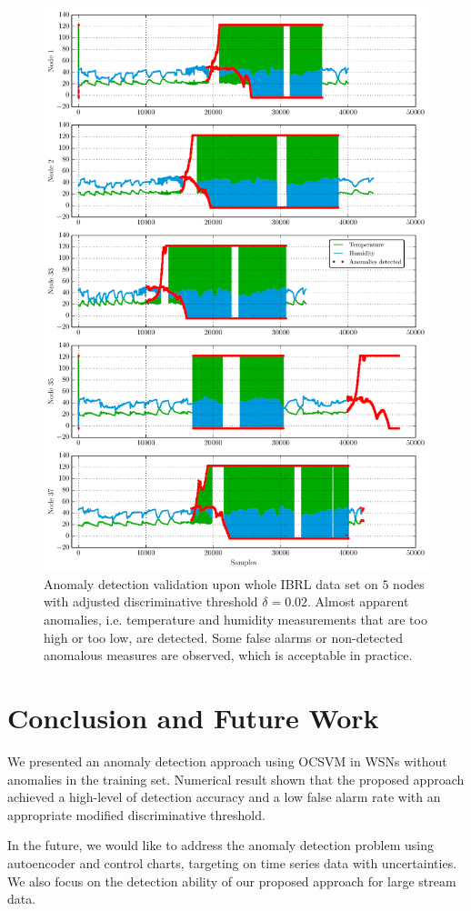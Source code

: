 \documentclass[conference]{IEEEtran}
\begin{document}
\begin{figure}
\centering
\includegraphics[scale=.7]{Python/time_validation.pdf}
\caption{Anomaly detection validation upon whole IBRL data set on $5$ nodes with adjusted discriminative threshold $\delta=0.02$. Almost apparent anomalies, i.e. temperature and humidity measurements that are too high or too low, are detected. Some false alarms or non-detected anomalous measures are observed, which is acceptable in practice.}
\label{fig:time_valid}
\end{figure}

\section{Conclusion and Future Work}\label{sec:concluding}

We presented an anomaly detection approach using OCSVM in WSNs without anomalies in the training set. Numerical result shown that the proposed approach achieved a high-level of detection accuracy and a low false alarm rate with an appropriate modified  discriminative threshold.  

In the future, we would like to address the anomaly detection problem using autoencoder and control charts, targeting on time series data with uncertainties. We also focus on the detection ability of our proposed approach for large stream data.



\end{document}
